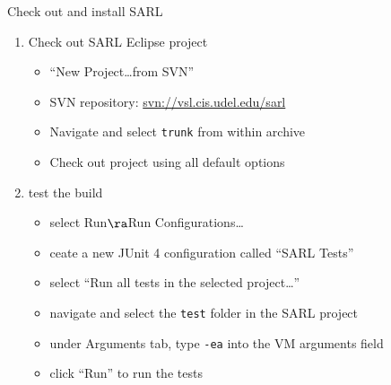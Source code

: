 \documentclass[t]{beamer}
\begin{document}
\begin{frame}{Check out and install SARL}
  \begin{enumerate}
  \item Check out SARL Eclipse project 
    \begin{itemize}
    \item ``New Project\ldots from SVN''
    \item SVN repository: \url{svn://vsl.cis.udel.edu/sarl}
    \item Navigate and select \texttt{trunk} from within archive
    \item Check out project using all default options
    \end{itemize}
  \item test the build
    \begin{itemize}
    \item select Run$\ra$Run Configurations\ldots
    \item ceate a new JUnit 4 configuration called ``SARL Tests''
    \item select ``Run all tests in the selected project\ldots''
    \item navigate and select the \texttt{test} folder in the SARL project
    \item under Arguments tab, type \texttt{-ea} into the VM arguments field
    \item click ``Run'' to run the tests
    \end{itemize}
  \end{enumerate}
\end{frame}
\end{document}
